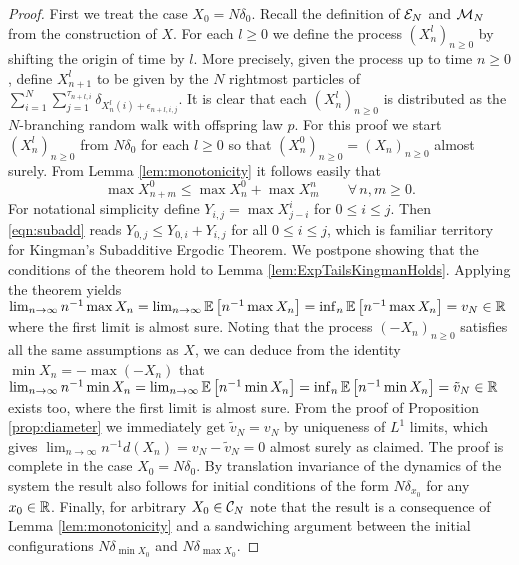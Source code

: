 \begin{proof}
First we treat the case $X_0 = N \delta_0$. Recall the definition of $\cal{E}_N$ and $\cal{M}_N$ from the construction of $X$. For each $l \geq 0$ we define the process $(X^l_n)_{n \geq 0}$ by shifting the origin of time by $l$. More precisely, given the process up to time $n \geq 0$, define $X^l_{n+1}$ to be given by the $N$ rightmost particles of $\sum_{i = 1}^N \sum_{j=1}^{\tau_{n + l,i}} \delta_{X^l_n(i) + \epsilon_{n + l, i, j}}$. It is clear that each $(X^l_n)_{n \geq 0}$ is distributed as the $N$-branching random walk with offspring law $p$. For this proof we start $(X^l_n)_{n \geq 0}$ from $N \delta_0$ for each $l \geq 0$ so that $(X^0_n)_{n \geq 0} = (X_n)_{n \geq 0}$ almost surely. From Lemma \ref{lem:monotonicity} it follows easily that 
\begin{equation}\label{eqn:subadd}
\max X^0_{n + m} \leq \max X^0_n + \max X^n_m \qquad \forall\, n,m \geq 0. 
\end{equation}
For notational simplicity define $Y_{i,j} = \max X^i_{j - i}$ for $0 \leq i \leq j$. Then \ref{eqn:subadd} reads $Y_{0, j} \leq Y_{0,i} + Y_{i,j}$ for all $0 \leq i \leq j$, which is familiar territory for Kingman's Subadditive Ergodic Theorem. We postpone showing that the conditions of the theorem hold to Lemma \ref{lem:ExpTailsKingmanHolds}. Applying the theorem yields $\lim_{n \to \infty} n^{-1} \max X_n = \lim_{n \to \infty} \Ex{n^{-1} \max X_n} = \inf_n \Ex{n^{-1} \max X_n} = v_N \in \R$ where the first limit is almost sure. Noting that the process $(-X_n)_{n \geq 0}$ satisfies all the same assumptions as $X$, we can deduce from the identity $\min X_n = - \max (-X_n)$ that $\lim_{n \to \infty} n^{-1} \min X_n = \lim_{n \to \infty} \Ex{n^{-1} \min X_n} = \inf_n \Ex{n^{-1} \min X_n} = \tilde{v}_N \in \R$ exists too, where the first limit is almost sure. From the proof of Proposition \ref{prop:diameter} we immediately get $\tilde{v}_N = v_N$ by uniqueness of $L^1$ limits, which gives $\lim_{n\to\infty} n^{-1}d(X_n) = v_N - \tilde{v}_N = 0$ almost surely as claimed. The proof is complete in the case $X_0 = N \delta_0$. By translation invariance of the dynamics of the system the result also follows for initial conditions of the form $N \delta_{x_0}$ for any $x_0 \in \R$. Finally, for arbitrary $X_0 \in \cal{C}_N$ note that the result is a consequence of Lemma \ref{lem:monotonicity} and a sandwiching argument between the initial configurations $N \delta_{\min X_0}$ and $N \delta_{\max X_0}$. 
\end{proof}

